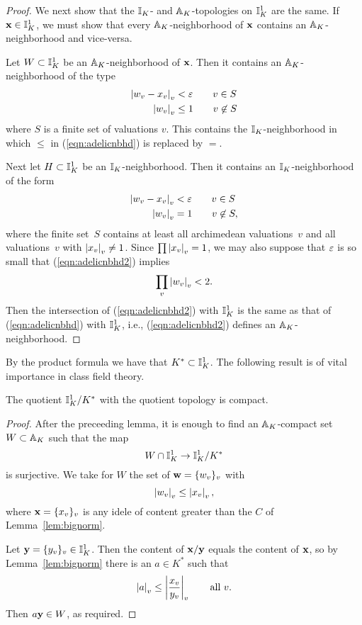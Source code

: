 \begin{proof}
We next show that the $\II_K$- and $\AA_K$-topologies on $\II_K^1$
are the same.  If $\bx\in \II_K^1$, we must show that every
$\AA_K$-neighborhood of $\bx$ contains an $\AA_K$-neighborhood
and vice-versa.

Let $W\subset \II_K^1$ be an $\AA_K$-neighborhood of $\bx$.  Then it
contains an $\AA_K$-neighborhood of the type
\begin{align}\label{eqn:adelicnbhd}
  \abs{w_v - x_v}_v &< \eps \qquad v\in S\\
  \abs{w_v}_v &\leq 1 \qquad v\not\in S
\end{align}
where $S$ is a finite set of valuations $v$.  This contains
the $\II_K$-neighborhood in which $\leq$ in (\ref{eqn:adelicnbhd})
is replaced by $=$.

Next let $H\subset \II_K^1$ be an $\II_K$-neighborhood.  Then it contains
an $\II_K$-neighborhood of the form
\begin{align}\label{eqn:adelicnbhd2}
  \abs{w_v - x_v}_v &< \eps \qquad v\in S\\
  \abs{w_v}_v &= 1 \qquad v\not\in S,
\end{align}
where the finite set~$S$ contains at least all archimedean
valuations~$v$ and all valuations~$v$ with 
$\abs{x_v}_v\neq 1$.  Since $\prod\abs{x_v}_v=1$, we may also
suppose that $\eps$ is so small that (\ref{eqn:adelicnbhd2})
implies 
$$
  \prod_v\abs{w_v}_v < 2.
$$
Then the intersection of  (\ref{eqn:adelicnbhd2}) with
$\II_K^1$ is the same as that of  (\ref{eqn:adelicnbhd})
with $\II_K^1$, i.e.,  (\ref{eqn:adelicnbhd2})
defines an $\AA_K$-neighborhood.
\end{proof}

By the product formula we have that $K^*\subset \II_K^1$.
The following result is of vital importance in class
field theory.
\begin{theorem}\label{thm:compquo}
The quotient $\II_K^1/K^*$ with the quotient topology
is compact.
\end{theorem}
\begin{proof}
After the preceeding lemma, it is enough to find
an $\AA_K$-compact set $W\subset \AA_K$ such that the map
$$
  W\meet \II_K^1 \to \II_K^1/K^*
$$
is surjective.  We take for $W$ the set of 
$\bw=\{w_v\}_v$ with
$$
  \abs{w_v}_v\leq \abs{x_v}_v,
$$
where $\bx=\{x_v\}_v$ is any idele of content greater than
the $C$ of Lemma~\ref{lem:bignorm}.

Let $\by=\{y_v\}_v\in \II_K^1$.  Then the content of $\bx/\by$ equals
the content of $\bx$, so by Lemma~\ref{lem:bignorm}
there is an $a\in K^*$ such that 
$$
  \abs{a}_v \leq \abs{\frac{x_v}{y_v}}_v \qquad\text{all $v$}.
$$
Then $a\by\in W$, as required.
\end{proof}

